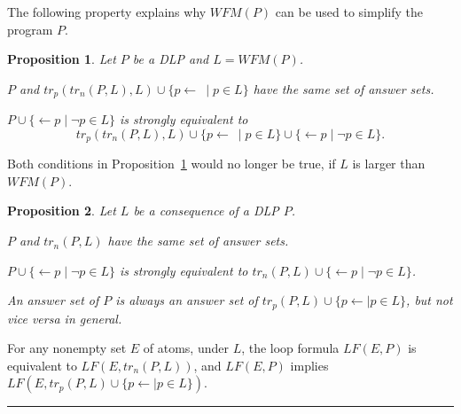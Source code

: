 \documentclass{article}
\newenvironment{tight_enumerate1}{
\begin{enumerate}[(i)]
  \setlength{\itemsep}{0pt}%
  \setlength{\topsep}{0pt}%
  \setlength{\partopsep}{0pt}%
  \setlength{\parskip}{0pt}%
  \setlength{\parsep}{0pt}%
}{\end{enumerate}}
\newenvironment{tight_itemize}{
\begin{itemize}
   \setlength{\itemsep}{0pt}%
  \setlength{\topsep}{0pt}%
  \setlength{\partopsep}{0pt}%
  \setlength{\parskip}{0pt}%
  \setlength{\parsep}{0pt}%
}{\end{itemize}}
\newtheorem{proposition}{Proposition}
\newenvironment{proofs}{{\bf Proof Sketch:}}{\rule{2mm}{2mm}\\[-.5em] }
\newcommand{\LF}{L\!F}
\newcommand{\trn}{tr_n}
\newcommand{\trp}{tr_p}
\newcommand{\WFM}{W\!F\!M}
\begin{document}
The following property explains why $\WFM(P)$ can be used to simplify the program $P$.
\begin{proposition}\label{prop:wfm}
Let $P$ be a DLP and $L = \WFM(P)$.
\begin{tight_enumerate1}
  \item $P$ and $\trp(\trn(P, L), L)\cup \{ p\gets\ \mid p\in L\}$ have the same set of answer sets.
  \item $P\cup \{\gets p\mid \neg p\in L\}$ is strongly equivalent to
  \[
  \trp(\trn(P, L), L)\cup \{ p\gets\ \mid p\in L\} \cup \{ \gets p\mid \neg p\in L\}.
  \]
\end{tight_enumerate1}
\end{proposition}

Both conditions in Proposition~\ref{prop:wfm} would no longer be true, if $L$ is larger than $\WFM(P)$.
\begin{comment}
The property can be further extended.
\begin{proposition}\label{prop:wfm:e}
Let $P$ be a DLP and $L = \WFM(P)$. The program
\[
P \cup  \{ \gets p\mid \neg p\in L\}
\]
is strongly equivalent to the program
\[
\trp(\trn(P, L), L)\cup \{ p\gets\ \mid p\in L\} \cup \{ \gets p\mid \neg p\in L\}.
\]
\end{proposition}
\end{comment}


\begin{proposition}\label{prop:c1}
  Let $L$ be a consequence of a DLP $P$.
  \begin{tight_itemize}
    \item $P$ and $\trn(P, L)$ have the same set of answer sets.
    \item $P\cup \{\gets p\mid \neg p\in L\}$ is strongly equivalent to
    $\trn(P, L) \cup \{\gets p\mid \neg p\in L\}$.
    \item An answer set of $P$ is always an answer set of $\trp(P, L)\cup \{p\gets \mid p\in L\}$, but not vice versa in general.
  \end{tight_itemize}
\end{proposition}
\begin{proofs}
  For any nonempty set $E$ of atoms, under $L$, the loop formula $\LF(E, P)$ is equivalent to $\LF(E, \trn(P, L))$, and $\LF(E, P)$ implies $\LF(E, \trp(P, L)\cup \{p\gets\mid p\in L\} )$.
\end{proofs}
\end{document}
